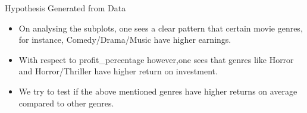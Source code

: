 \documentclass{beamer}
\begin{document}
\begin{frame}{Hypothesis Generated from Data}

\begin{itemize}
\item On analysing the subplots, one sees a clear pattern that certain movie genres, for instance, Comedy/Drama/Music  have higher earnings.
\item With respect to profit\_percentage however,one sees that genres like Horror and Horror/Thriller have higher return on investment.
\item We try to test if the above mentioned genres have higher returns on average compared to other genres. 

\end{itemize}
%
%
\end{frame}
\end{document}
